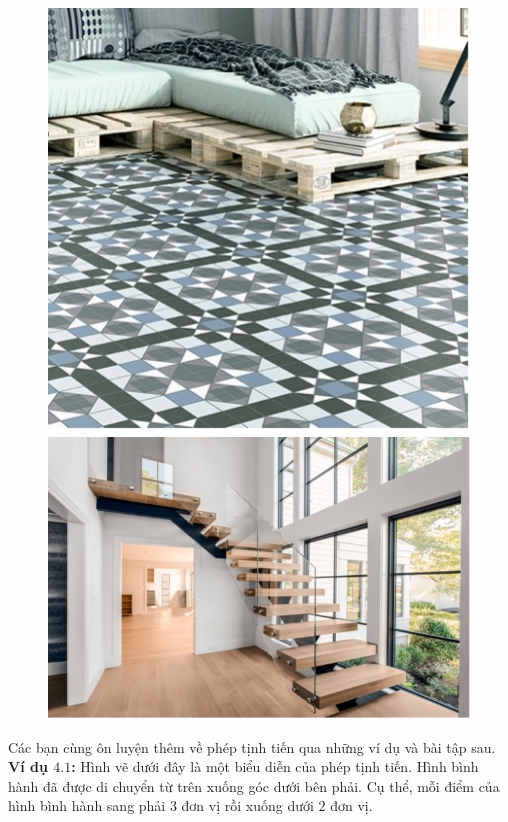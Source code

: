 \begin{multicols}{2}
\begin{figure}[H]
		\includegraphics[width= 1\linewidth]{Picture35}
		\includegraphics[width= 1\linewidth]{Picture36}
		\vspace*{-10pt}
	\end{figure}
	Các bạn cùng ôn luyện thêm về phép tịnh tiến qua những ví dụ và bài tập sau.
	\vskip 0.1cm
	\textbf{\color{toancuabi}Ví dụ $\pmb{4.1}$:} Hình vẽ dưới đây là một biểu diễn của phép tịnh tiến. Hình bình hành đã được di chuyển từ trên xuống góc dưới bên phải. Cụ thể, mỗi điểm của hình bình hành sang phải $3$ đơn vị rồi xuống dưới $2$ đơn vị.

\end{multicols}
